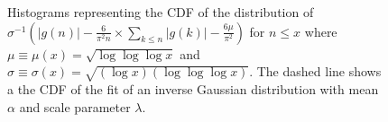 \documentclass[11pt,reqno,a4letter]{article}
\numberwithin{equation}{section}
\numberwithin{figure}{section}
\numberwithin{table}{section}
\theoremstyle{plain}
\numberwithin{theorem}{section}
\theoremstyle{definition}
\begin{document}
\begin{figure}[t!]
\begin{subfigure}{0.47\textwidth}
\end{subfigure}\hfil
\centering
\begin{subfigure}{0.47\textwidth}
\end{subfigure}

\caption{Histograms representing the CDF of the distribution of 
         $\sigma^{-1} \left(|g(n)| - \frac{6}{\pi^2 n} \times \sum_{k \leq n} |g(k)| - \frac{6\mu}{\pi^2}\right)$  
         for $n \leq x$ where $\mu \equiv \mu(x) = \sqrt{\log\log\log x}$ and 
         $\sigma \equiv \sigma(x) = \sqrt{(\log x) (\log\log\log x)}$. 
         The dashed line shows a the CDF of the fit of an inverse Gaussian distribution with 
         mean $\alpha$ and scale parameter $\lambda$. }
\label{figure_HistgInvnDistUns_Comparisons_v1}

\end{figure}
\end{document}
